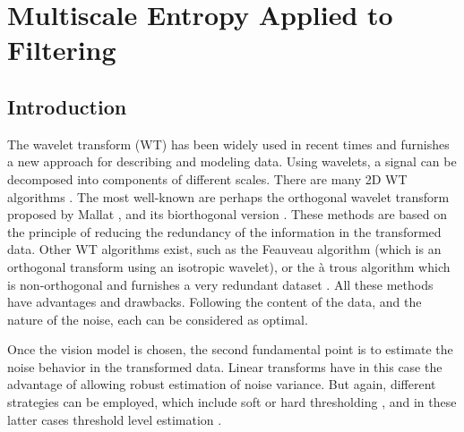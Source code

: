 
\chapter{Multiscale Entropy Applied to Filtering}
\section{Introduction}
\label{ch_filter}

 The wavelet transform (WT) has been widely used in recent times and
furnishes a new approach for describing and modeling  data. Using wavelets,
a signal can be decomposed into components of different scales.  
There are many 2D WT algorithms \cite{starck:book98}. The most well-known are 
perhaps the orthogonal
wavelet transform proposed by Mallat \cite{wave:mallat89}, and its biorthogonal
version \cite{wave:cohen92}. These methods are based on the principle of
reducing 
the redundancy of the information in the transformed data. Other WT algorithms
exist, such as the Feauveau algorithm \cite{wave:feauveau} (which is an 
orthogonal
transform using an isotropic wavelet), or the \`a trous algorithm which 
is non-orthogonal and
furnishes a very redundant dataset \cite{wave:hol89}. All these methods have 
advantages and
drawbacks. Following the content of the data, and the nature of the noise,
each can be considered as optimal. 

Once the vision model is
chosen, the second fundamental point is to estimate the noise behavior in
the transformed data. Linear transforms have in this case the advantage of
allowing robust estimation of noise variance. But again, different strategies
can be employed, which include soft or hard thresholding 
\cite{rest:donoho93_1,rest:donoho93_2}, 
and in these latter cases threshold level estimation
\cite{starck:sta94_4,rest:moulin99,rest:donoho93_1,rest:krim92,wave:chipman97,wave:amato97,wave:nason94,wave:nason96,wave:nason96}.

